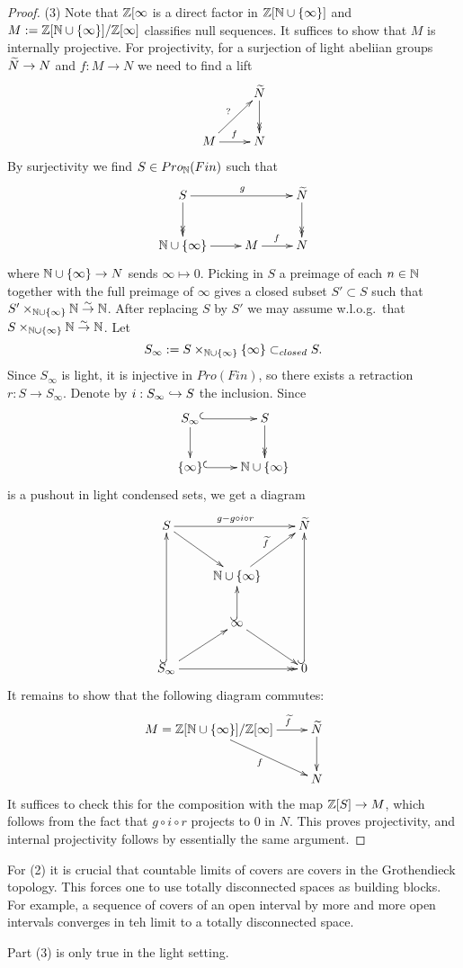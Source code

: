 \documentclass{notes}
\begin{document}
\begin{proof}
(3) Note that ${\mathbb{Z}}[\infty$ is a direct factor in ${\mathbb{Z}}[{\mathbb{N}}\cup\{\infty\}]$
  and $M:={\mathbb{Z}}[{\mathbb{N}}\cup\{\infty\}]/{\mathbb{Z}}[\infty]$ classifies null sequences.
It suffices to show that $M$ is internally projective. For
projectivity, for a surjection of light abeliian groups $\widetilde N\to N$
and $f:M\to N$ we need to find a lift
$$
\xymatrix{
  & \wt N \ar@{->>}[d] \\ M \ar[ur]^{?} \ar[r]^f & N
}
$$
By surjectivity we find $S\in Pro_{\mathbb{N}}(Fin)$ such that
$$
\xymatrix{
  S \ar@{->>}[d] \ar[rr]^g & & \wt N \ar@{->>}[d] \\ \N\cup\{\infty\} \ar[r] & M \ar[r]^f & N
}
$$
where ${\mathbb{N}}\cup\{\infty\}\to N$ sends $\infty\mapsto 0$. 
Picking in $S$ a preimage of each $n\in{\mathbb{N}}$ together with the full
preimage of $\infty$ gives a closed subset $S'\subset S$ such that
$S'\times_{{\mathbb{N}}\cup\{\infty\}}{\mathbb{N}}\stackrel{\sim}\to{\mathbb{N}}$. After replacing $S$
by $S'$ we may assume w.l.o.g.~that $S\times_{{\mathbb{N}}\cup\{\infty\}}{\mathbb{N}}\stackrel{\sim}\to{\mathbb{N}}$.
Let
$$
  S_\infty := S\times_{{\mathbb{N}}\cup\{\infty\}}\{\infty\}\subset_{closed}S.
$$
Since $S_\infty$ is light, it is injective in $Pro(Fin)$, so there
exists a retraction $r:S\to S_\infty$. Denote by $i:S_\infty\hookrightarrow S$
the inclusion. Since
$$
\xymatrix{
  S_\infty \ar[d] \ar@{^{(}->}[r] & S \ar@{->>}[d] \\
  \{\infty\} \ar@{^{(}->}[r] & \N\cup\{\infty\}
}
$$
is a pushout in light condensed sets, we get a diagram
$$
\xymatrix{
  S \ar[dr] \ar[rr]^{g-g\circ i\circ r} & & \wt N \\
  & \N\cup\{\infty\} \ar[ur]^{\wt f} & \\
  & \infty \ar[dr] \ar@{^{(}->}[u] & \\
  S_\infty \ar@{^{(}->}[uuu] \ar[ur] \ar@{->>}[rr] & & 0 \ar@{^{(}->}[uuu]
}
$$
It remains to show that the following diagram commutes:
$$
\xymatrix{
  M = \Z[\N\cup\{\infty\}]/\Z[\infty] \ar[dr]_f
  \ar[r]^{\ \ \ \ \ \ \ \ \ \ \ \ \wt f} & \wt N \ar[d] \\
  & N
}
$$
It suffices to check this for the composition with the map ${\mathbb{Z}}[S]\to
M$, which follows from the fact that $g\circ i\circ r$ projects to $0$
in $N$.
This proves projectivity, and internal projectivity follows by
essentially the same argument. 
\end{proof}

\begin{remark}
For (2) it is crucial that countable limits of covers are covers in
the Grothendieck topology. This forces one to use totally disconnected
spaces as building blocks. For example, a sequence of covers of an
open interval by more and more open intervals converges in teh limit
to a totally disconnected space. 

Part (3) is only true in the light setting. 
\end{remark}
\end{document}
